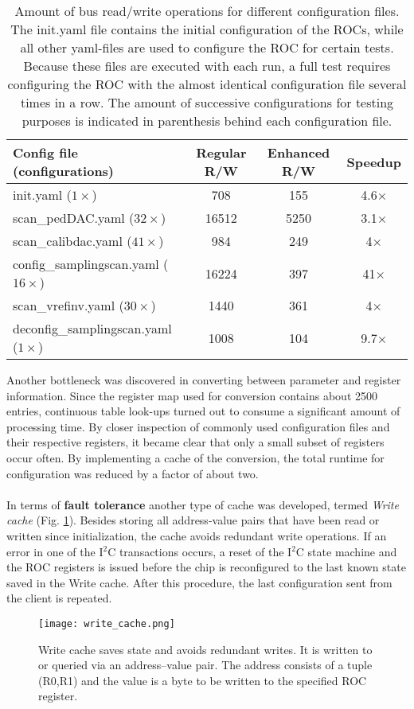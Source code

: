 \documentclass[../../main.tex]{subfiles}
\begin{document}
\begin{table}[htp]
\centering
	\caption{Amount of bus read/write operations for different configuration files. The init.yaml file contains the initial configuration of the ROCs, while all other yaml-files are used to configure the ROC for certain tests. Because these files are executed with each run, a full test requires configuring the ROC with the almost identical configuration file several times in a row. The amount of successive configurations for testing purposes is indicated in parenthesis behind each configuration file.}
\begin{tabular}{ l || c | c | c}
	\textbf{Config file (configurations)} & \textbf{Regular R/W} & \textbf{Enhanced R/W} & \textbf{Speedup}\\
	\hline
	init.yaml ($1\times$)	& 708 & 155 & 4.6$\times$\\
	scan\_pedDAC.yaml ($32\times$) & 16512 & 5250 & 3.1$\times$\\
	scan\_calibdac.yaml ($41\times$) & 984 & 249 & 4$\times$\\
	config\_samplingscan.yaml ($16\times$) & 16224 & 397 & 41$\times$\\
	scan\_vrefinv.yaml ($30\times$) & 1440 & 361 & 4$\times$\\
	deconfig\_samplingscan.yaml ($1\times$) & 1008 & 104 & 9.7$\times$
\end{tabular}
\label{tab:bus}
\end{table}
Another bottleneck was discovered in converting between parameter and register information. Since the register map used for conversion contains about 2500 entries, continuous table look-ups turned out to consume a significant amount of processing time. By closer inspection of commonly used configuration files and their respective registers, it became clear that only a small subset of registers occur often. By implementing a cache of the conversion, the total runtime for configuration was reduced by a factor of about two.\\
\\
In terms of \textbf{fault tolerance} another type of cache was developed, termed \textit{Write cache} (Fig. \ref{fig:write_cache}). Besides storing all address-value pairs that have been read or written since initialization, the cache avoids redundant write operations. If an error in one of the I$^2$C transactions occurs, a reset of the I$^2$C state machine and the ROC registers is issued before the chip is reconfigured to the last known state saved in the Write cache. After this procedure, the last configuration sent from the client is repeated.\\
\begin{figure}[htp]
\begin{center}
	\texttt{[image: write\_cache.png]}
	\caption{Write cache saves state and avoids redundant writes. It is written to or queried via an address--value pair. The address consists of a tuple (R0,R1) and the value is a byte to be written to the specified ROC register.}
	\label{fig:write_cache}
\end{center}
\end{figure}
\end{document}
